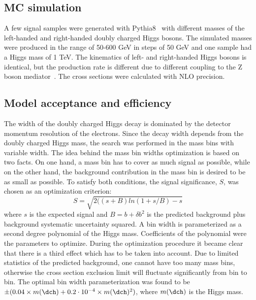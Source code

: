 \subsection{MC simulation}
A few signal samples were generated with Pythia8~\cite{pythia8} with different masses of the left-handed and right-handed doubly charged Higgs bosons.
The simulated masses were produced in the range of 50-600 GeV in steps of 50 GeV and one sample had a Higgs mass of 1 TeV.
The kinematics of left- and right-handed Higgs bosons is identical, but the production rate is different due to different coupling to the Z boson mediator~\cite{dch_note}. The cross sections were calculated with NLO precision. 

\subsection{Model acceptance and efficiency}
The width of the doubly charged Higgs decay is dominated by the detector momentum resolution of the electrons. Since the decay width depends from the doubly charged Higgs mass, the search was performed in the mass bins with variable width.
The idea behind the mass bin widths optimization is based on two facts. On one hand, a mass bin has to cover as much signal as possible,
while on the other hand, the background contribution in the mass bin is desired to be as small as possible.
To satisfy both conditions, the signal significance, $S$, was chosen as an optimization criterion:
\begin{equation}
 S = \sqrt{ 2((s+B)ln(1+s/B)-s } 
\end{equation}
where $s$ is the expected signal and $B=b+\delta b^2$ is the predicted background plus background systematic uncertainty squared.
A bin width is parameterized as a second degree polynomial of the Higgs mass.
Coefficients of the polynomial were the parameters to optimize.
During the optimization procedure it became clear that there is a third effect which has to be taken into account.
Due to limited statistics of the predicted background, one cannot have too many mass bins, otherwise the cross section
exclusion limit will fluctuate significantly from bin to bin. 
The optimal bin width parameterization was found to be $\pm(0.04 \times m(\dch) + 0.2 \cdot 10^{-4} \times m(\dch)^{2})$,
where $m(\dch)$ is the Higgs mass.

